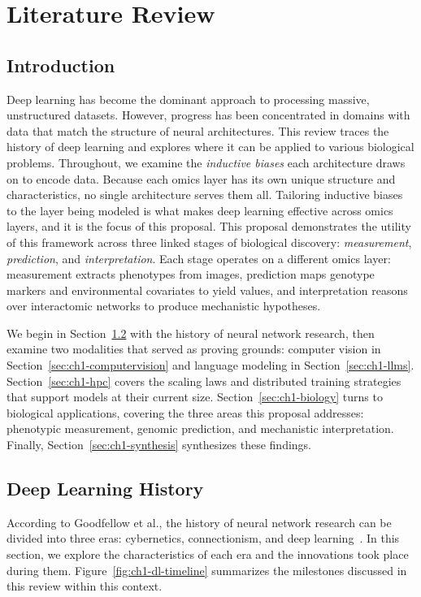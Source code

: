 \chapter{Literature Review} \label{ch1:lit-review}

\section{Introduction}\label{sec:ch1-intro}
Deep learning has become the dominant approach to processing massive, unstructured datasets. However, progress has been concentrated in domains with data that match the structure of neural architectures. This review traces the history of deep learning and explores where it can be applied to various biological problems. Throughout, we examine the \textit{inductive biases} each architecture draws on to encode data. Because each omics layer has its own unique structure and characteristics, no single architecture serves them all. Tailoring inductive biases to the layer being modeled is what makes deep learning effective across omics layers, and it is the focus of this proposal. This proposal demonstrates the utility of this framework across three linked stages of biological discovery: \textit{measurement}, \textit{prediction}, and \textit{interpretation}. Each stage operates on a different omics layer: measurement extracts phenotypes from images, prediction maps genotype markers and environmental covariates to yield values, and interpretation reasons over interactomic networks to produce mechanistic hypotheses.

We begin in Section~\ref{sec:ch1-history} with the history of neural network research, then examine two modalities that served as proving grounds: computer vision in Section~\ref{sec:ch1-computervision} and language modeling in Section~\ref{sec:ch1-llms}. Section~\ref{sec:ch1-hpc} covers the scaling laws and distributed training strategies that support models at their current size. Section~\ref{sec:ch1-biology} turns to biological applications, covering the three areas this proposal addresses: phenotypic measurement, genomic prediction, and mechanistic interpretation. Finally, Section~\ref{sec:ch1-synthesis} synthesizes these findings.

\section{Deep Learning History}\label{sec:ch1-history}
According to Goodfellow et al., the history of neural network research can be divided into three eras: cybernetics, connectionism, and deep learning~\cite{Goodfellow-et-al-2016}. In this section, we explore the characteristics of each era and the innovations took place during them. Figure~\ref{fig:ch1-dl-timeline} summarizes the milestones discussed in this review within this context.

